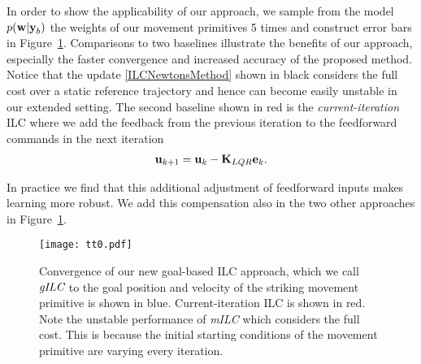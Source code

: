 
In order to show the applicability of our approach, we sample from the model $p(\boldsymbol{\mathrm{w}}|\boldsymbol{\mathrm{y}}_b)$ the weights of our movement primitives 5 times and construct error bars in Figure~\ref{ILCTrajectoryTT}. Comparisons to two baselines illustrate the benefits of our approach, especially the faster convergence and increased accuracy of the proposed method. Notice that the update \eqref{ILCNewtonsMethod} shown in black considers the full cost over a static reference trajectory and hence can become easily unstable in our extended setting. The second baseline shown in red is the \emph{current-iteration} ILC where we add the feedback from the previous iteration to the feedforward commands in the next iteration
%
\begin{equation}
\begin{aligned}
\boldsymbol{\mathrm{u}}_{k+1} &= \boldsymbol{\mathrm{u}}_k - \boldsymbol{\mathrm{K}}_{LQR}\boldsymbol{\mathrm{e}}_{k}.\\
\end{aligned}
\label{fbILC}
\end{equation}
%

\noindent In practice we find that this additional adjustment of feedforward inputs makes learning more robust. We add this compensation also in the two other approaches in Figure~\ref{ILCTrajectoryTT}.



\begin{figure}
\center
\texttt{[image: tt0.pdf]}
\caption{Convergence of our new goal-based ILC approach, which we call $\emph{gILC}$ to the goal position and velocity of the striking movement primitive is shown in blue. Current-iteration ILC is shown in red. Note the unstable performance of \emph{mILC} which considers the full cost. This is because the initial starting conditions of the movement primitive are varying every iteration.}
\label{ILCTrajectoryTT}
\end{figure}